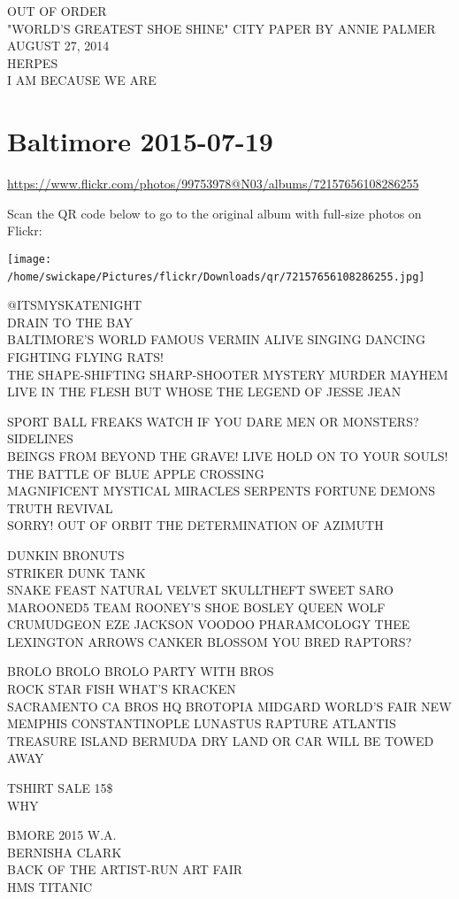 \documentclass[10pt,letterpaper]{article}
\begin{document}
OUT OF ORDER\\
"WORLD'S GREATEST SHOE SHINE" CITY PAPER BY ANNIE PALMER AUGUST 27, 2014\\
HERPES\\
I AM BECAUSE WE ARE
\

\section*{Baltimore 2015-07-19}

\url{https://www.flickr.com/photos/99753978@N03/albums/72157656108286255}

Scan the QR code below to go to the original album with full-size photos on Flickr:

\texttt{[image: /home/swickape/Pictures/flickr/Downloads/qr/72157656108286255.jpg]}
\

@ITSMYSKATENIGHT\\
DRAIN TO THE BAY\\
BALTIMORE'S WORLD FAMOUS VERMIN ALIVE SINGING DANCING FIGHTING FLYING RATS!\\
THE SHAPE{-}SHIFTING SHARP{-}SHOOTER MYSTERY MURDER MAYHEM LIVE IN THE FLESH BUT WHOSE THE LEGEND OF JESSE JEAN

SPORT BALL FREAKS WATCH IF YOU DARE MEN OR MONSTERS?  SIDELINES\\
BEINGS FROM BEYOND THE GRAVE!   LIVE HOLD ON TO YOUR SOULS!  THE BATTLE OF BLUE APPLE CROSSING\\
MAGNIFICENT MYSTICAL MIRACLES SERPENTS FORTUNE DEMONS TRUTH REVIVAL\\
SORRY!  OUT OF ORBIT THE DETERMINATION OF AZIMUTH

DUNKIN BRONUTS\\
STRIKER DUNK TANK\\
SNAKE FEAST NATURAL VELVET SKULLTHEFT SWEET SARO MAROONED5 TEAM ROONEY'S SHOE BOSLEY QUEEN WOLF CRUMUDGEON EZE JACKSON VOODOO PHARAMCOLOGY THEE LEXINGTON ARROWS CANKER BLOSSOM YOU BRED RAPTORS?

BROLO BROLO BROLO PARTY WITH BROS\\
ROCK STAR FISH WHAT'S KRACKEN\\
SACRAMENTO CA BROS HQ BROTOPIA MIDGARD WORLD'S FAIR NEW MEMPHIS CONSTANTINOPLE LUNASTUS RAPTURE ATLANTIS TREASURE ISLAND BERMUDA DRY LAND OR CAR WILL BE TOWED AWAY

TSHIRT SALE 15\$\\
WHY

BMORE 2015 W.A.\\
BERNISHA CLARK\\
BACK OF THE ARTIST{-}RUN ART FAIR\\
HMS TITANIC
\end{document}
